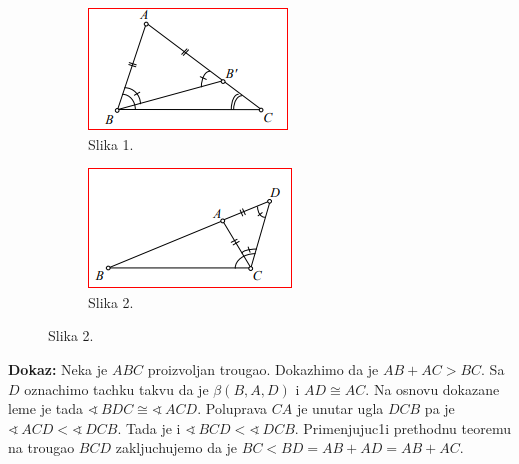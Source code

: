 \documentclass[11pt]{article}
\def\ug{\mathbin{\sphericalangle\,}}
\begin{document}
\begin{large}
\begin{flushleft}
\begin{figure}[h!]
\begin{subfigure}{0.35\textwidth}
\includegraphics[width=\linewidth]{Slike/Slika1}
\caption*{Slika 1.} 
\end{subfigure}
\hspace*{\fill}
\begin{subfigure}{0.35\textwidth}
\includegraphics[width=\linewidth]{Slike/Slika2}
\caption*{Slika 2.} 
\end{subfigure}
\end{figure}


\begin{frame}{}
\vspace{0.5cm}
\end{frame}
\textbf{Dokaz:} Neka je $ABC$ proizvoljan trougao. Dokazhimo da je $AB+AC>BC$. Sa $D$ oznachimo tachku takvu da je  $\beta(B,A,D)$ i $AD\cong AC$. Na osnovu dokazane leme je tada $\ug BDC \cong \ug ACD$. Poluprava $CA$ je unutar ugla $DCB$ pa je $\ug ACD< \ug DCB$. Tada je i $\ug BCD<\ug DCB$. Primenjujuc1i prethodnu teoremu na trougao $BCD$ zakljuchujemo da je $BC<BD=AB+AD=AB+AC$.
\newpage


\end{flushleft}
\end{large}
\end{document}
